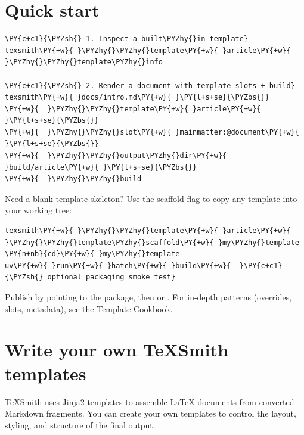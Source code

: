 \documentclass[a4paper,twoside]{article}
\begin{document}
\section{Quick start}
\begin{tscode}[lang=bash, engine=pygments]
\begin{Verbatim}[commandchars=\\\{\},breaklines, breakanywhere, commandchars=\\\{\}]
\PY{c+c1}{\PYZsh{} 1. Inspect a built\PYZhy{}in template}
texsmith\PY{+w}{ }\PYZhy{}\PYZhy{}template\PY{+w}{ }article\PY{+w}{ }\PYZhy{}\PYZhy{}template\PYZhy{}info

\PY{c+c1}{\PYZsh{} 2. Render a document with template slots + build}
texsmith\PY{+w}{ }docs/intro.md\PY{+w}{ }\PY{l+s+se}{\PYZbs{}}
\PY{+w}{  }\PYZhy{}\PYZhy{}template\PY{+w}{ }article\PY{+w}{ }\PY{l+s+se}{\PYZbs{}}
\PY{+w}{  }\PYZhy{}\PYZhy{}slot\PY{+w}{ }mainmatter:@document\PY{+w}{ }\PY{l+s+se}{\PYZbs{}}
\PY{+w}{  }\PYZhy{}\PYZhy{}output\PYZhy{}dir\PY{+w}{ }build/article\PY{+w}{ }\PY{l+s+se}{\PYZbs{}}
\PY{+w}{  }\PYZhy{}\PYZhy{}build
\end{Verbatim}
\end{tscode}
Need a blank template skeleton? Use the scaffold flag to copy any template into
your working tree:
\begin{tscode}[lang=bash, engine=pygments]
\begin{Verbatim}[commandchars=\\\{\},breaklines, breakanywhere, commandchars=\\\{\}]
texsmith\PY{+w}{ }\PYZhy{}\PYZhy{}template\PY{+w}{ }article\PY{+w}{ }\PYZhy{}\PYZhy{}template\PYZhy{}scaffold\PY{+w}{ }my\PYZhy{}template
\PY{n+nb}{cd}\PY{+w}{ }my\PYZhy{}template
uv\PY{+w}{ }run\PY{+w}{ }hatch\PY{+w}{ }build\PY{+w}{  }\PY{c+c1}{\PYZsh{} optional packaging smoke test}
\end{Verbatim}
\end{tscode}
Publish by pointing  to the  package, then  or .
For in-depth patterns (overrides, slots, metadata), see the Template Cookbook.
\section{Write your own TeXSmith templates}
TeXSmith uses Jinja2 templates to assemble \LaTeX{} documents from converted
Markdown fragments. You can create your own templates to control the layout,
styling, and structure of the final output.
\end{document}
